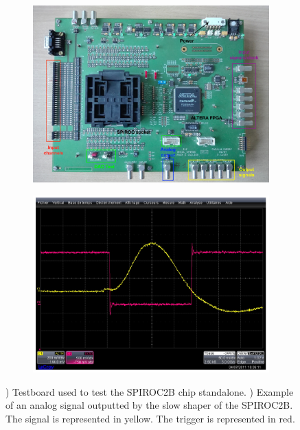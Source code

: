 \begin{figure}[htbp!]
  \centering
  \begin{subfigure}[t]{0.49\textwidth}
    \includegraphics[width=1.\linewidth]{chap4/fig_Commi/TestBoard.jpg}
    \caption{} \label{fig:Testboard_SP2B}
  \end{subfigure}
  \hfill
  \begin{subfigure}[t]{0.49\textwidth}
    \includegraphics[width=1.\linewidth]{chap4/fig_Commi/AnalogSignalSP2B.jpeg}
    \caption{} \label{fig:AnalogSignal_SP2B}
  \end{subfigure}
  \caption{) Testboard used to test the SPIROC2B chip standalone. ) Example of an analog signal outputted by the slow shaper of the SPIROC2B. The signal is represented in yellow. The trigger is represented in red.}
\end{figure}

